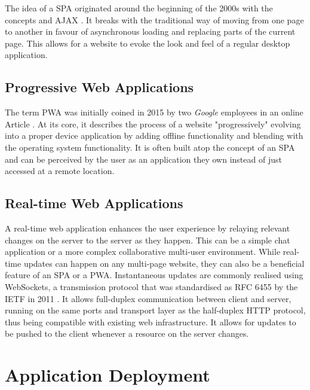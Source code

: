 The idea of a \ac{SPA} originated around the beginning of the 2000s with the concepts  \parencite{innerBrowsing} and \ac{AJAX} \parencite{ajaxNewApproach}. It breaks with the traditional way of moving from one page to another in favour of asynchronous loading and replacing parts of the current page. This allows for a website to evoke the look and feel of a regular desktop application.

\subsection{Progressive Web Applications}

The term \ac{PWA} was initially coined in 2015 by two \emph{Google} employees in an online Article \parencite{progressiveWebApplications}. At its core, it describes the process of a website "progressively" evolving into a proper device application by adding offline functionality and blending with the operating system functionality. It is often built atop the concept of an \ac{SPA} and can be perceived by the user as an application they own instead of just accessed at a remote location.

\subsection{Real-time Web Applications}

A real-time web application enhances the user experience by relaying relevant changes on the server to the server as they happen. This can be a simple chat application or a more complex collaborative multi-user environment. While real-time updates can happen on any multi-page website, they can also be a beneficial feature of an \ac{SPA} or a \ac{PWA}. Instantaneous updates are commonly realised using WebSockets, a transmission protocol that was standardised as \ac{RFC} 6455 by the \ac{IETF} in 2011 \parencite{webSocketsProtocolRfc}. It allows full-duplex communication between client and server, running on the same ports and transport layer as the half-duplex \ac{HTTP} protocol, thus being compatible with existing web infrastructure. It allows for updates to be pushed to the client whenever a resource on the server changes.



\section{Application Deployment}

